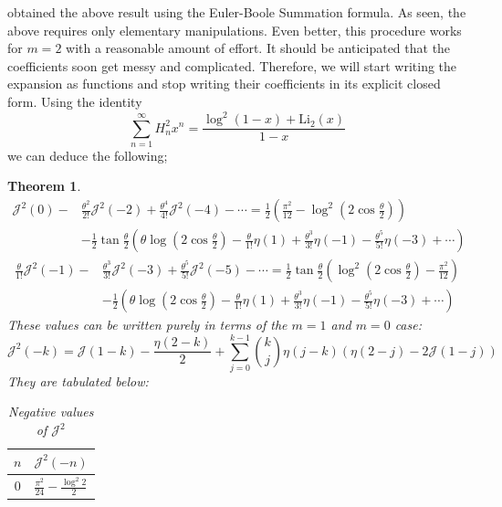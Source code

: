 \documentclass{article}
\newtheorem{theorem}{Theorem}
\begin{document}
\cite{boyadzhiev2009alternating} obtained the above result using the Euler-Boole Summation formula. As seen, the above requires only elementary manipulations. Even better, this procedure works for $m=2$ with a reasonable amount of effort.
It should be anticipated that the coefficients soon get messy and complicated. Therefore, we will start writing the expansion as functions and stop writing their coefficients in its explicit closed form.
Using the identity $$\sum_{n=1}^{\infty}H_n^2 x^n=\frac{\log^2(1-x)+\mathrm{Li}_2(x)}{1-x}$$
we can deduce the following;
\begin{theorem}
   \begin{equation}\begin{split}
         \mathcal{J}^2(0)-&\frac{\theta^2}{2!}\mathcal{J}^2(-2)+\frac{\theta^4}{4!}\mathcal{J}^2(-4)-\cdots =\frac{1}{2}\left(\frac{\pi^2}{12}-\log^2\left(2\cos \frac{\theta}{2}\right)\right)\\ &-\frac{1}{2}\tan\frac{\theta}{2}\left( \theta \log\left(2\cos \frac{\theta}{2}\right)-\frac{\theta}{1!}\eta(1)+\frac{\theta^3}{3!}\eta(-1)-\frac{\theta^5}{5!}\eta(-3)+\cdots\right) \end{split}\end{equation}\begin{equation}\begin{split}
            \frac{\theta}{1!}\mathcal{J}^2(-1)-& \frac{\theta^3}{3!}\mathcal{J}^2(-3)+\frac{\theta^5}{5!}\mathcal{J}^2(-5)-\cdots = \frac{1}{2}\tan \frac{\theta}{2}\left(\log^2\left(2\cos \frac{\theta}{2}\right)-\frac{\pi^2}{12}\right)\\ &-\frac{1}{2}\left(\theta \log\left(2\cos \frac{\theta}{2}\right) -\frac{\theta}{1!}\eta(1)+\frac{\theta^3}{3!}\eta(-1)-\frac{\theta^5}{5!}\eta(-3)+\cdots\right)\end{split}
         \end{equation}
    These values can be written purely in terms of the $m=1$ and $m=0$ case: \begin{equation}\label{negative integers of J2}
        \mathcal{J}^2(-k)=\mathcal{J}(1-k)-\frac{\eta(2-k)}{2}+\sum_{j=0}^{k-1}\binom{k}{j}\eta(j-k)\left(\eta(2-j)-2\mathcal{J}(1-j)\right)
    \end{equation}
They are tabulated below:
       \begin{table}[h] \caption{Negative values of $\mathcal{J}^2$}\label{tab1}
        \begin{tabular}{|c|l|} \hline 
     $n$ & $\mathcal{J}^2(-n)$  \\ \hline 
     $0$  & $\frac{\pi^2}{24}-\frac{\log^2 2}{2}$  \\ \hline    

\end{tabular}
\end{table}
\end{theorem}
\end{document}
